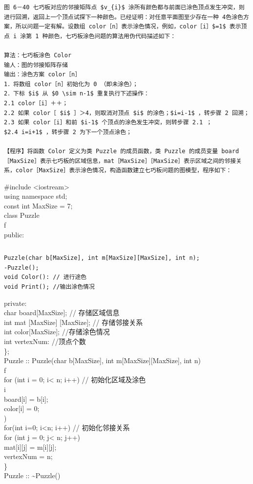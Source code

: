 \documentclass[10pt]{article}
\begin{document}
\begin{verbatim}
图 6－40 七巧板对应的邻接矩阵点 $v_{i}$ 涂所有颜色都与前面已涂色顶点发生冲突，则进行回溯，返回上一个顶点试探下一种颜色。已经证明：对任意平面图至少存在一种 4色涂色方案，所以问题一定有解。设数组 color［n］表示涂色情况，例如，color［i］$=1$ 表示顶点 i 涂第 1 种颜色，七巧板涂色问题的算法用伪代码描述如下：

算法：七巧板涂色 Color
输人：图的邻接矩阵存储
输出：涂色方案 color［n］
1．将数组 color［n］初始化为 0 （即未涂色）；
2．下标 $i$ 从 $0 \sim n-1$ 重复执行下述操作：
2.1 color［i］＋＋；
2.2 如果 color［ $i$ ］＞4，则取消对顶点 $i$ 的涂色；$i=i-1$ ，转步骤 2 回溯；
2.3 如果 color［i］和前 $i-1$ 个顶点的涂色发生冲突，则转步骤 2.1 ；
$2.4 i=i+1$ ，转步骤 2 为下一个顶点涂色；

【程序】将函数 Color 定义为类 Puzzle 的成员函数，类 Puzzle 的成员变量 board［MaxSize］表示七巧板的区域信息，mat［MaxSize］［MaxSize］表示区域之间的邻接关系，color［MaxSize］表示涂色情况，构造函数建立七巧板问题的图模型，程序如下：
\end{verbatim}

\#include <iostream>\\
using namespace std;\\
const int MaxSize = 7;\\
class Puzzle\\
f\\
public:

\begin{verbatim}

\end{verbatim}

\begin{verbatim}
Puzzle(char b[MaxSize], int m[MaxSize][MaxSize], int n);
-Puzzle();
void Color(): // 进行途色
void Print(); //输出涂色情况
\end{verbatim}

private:\\[0pt]
char board[MaxSize]; // 存储区域信息\\[0pt]
int mat [MaxSize] [MaxSize]; // 存储邻接关系\\[0pt]
int color[MaxSize]; //存储涂色情况\\
int vertexNum: //顶点个数\\
\};\\[0pt]
Puzzle :: Puzzle(char b[MaxSize], int m[MaxSize][MaxSize], int n)\\
f\\
for (int i = 0; i< n; i++) // 初始化区域及涂色\\
i\\[0pt]
board[i] = b[i];\\[0pt]
color[i] = 0;\\
)\\
for(int i=0; i<n; i++) // 初始化邻接关系\\
for (int j = 0; j< n; j++)\\[0pt]
mat[i][j] = m[i][j];\\
vertexNum = n;\\
\}\\
Puzzle :: \~{}Puzzle()
\end{document}
